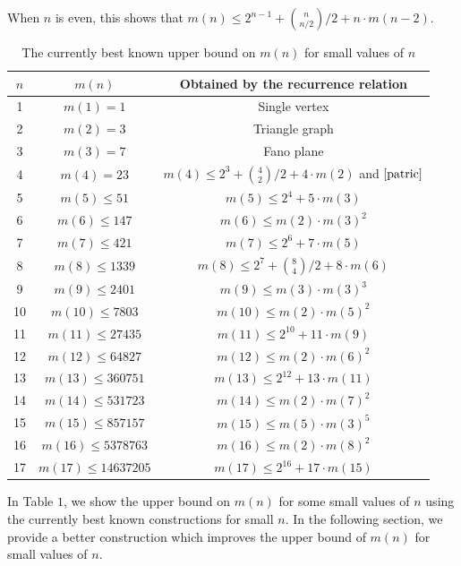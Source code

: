 \documentclass[11pt]{article}
\begin{document}
\noindent When $n$ is even, this shows that $m(n) \leq 2^{n-1} + {n \choose {n / 2}}/{2} + n \cdot m(n-2)$.
\begin{table}
\caption{The currently best known upper bound on $m(n)$ for small values of $n$}
\begin{center}
\begin{tabular}{|c|c|c|}
\hline
$n$ & $m(n)$ & Obtained by the recurrence relation\\
\hline
1& $m(1) = 1$&Single vertex\\
2&$m(2) = 3$&Triangle graph\\
3&$m(3) = 7$&Fano plane \cite{klein}\\
4&$m(4) = 23$&$m(4) \leq 2^3 + {4 \choose 2} / {2} + 4 \cdot m(2)$ and $\cite{patric}$\\
5&$m(5) \leq 51$&$m(5) \leq 2^4 + 5 \cdot m(3)$\\
6&$m(6) \leq 147$&$m(6) \leq m(2) \cdot m(3)^2$\\
7&$m(7) \leq 421$&$m(7) \leq 2^6 + 7 \cdot m(5)$\\
8&$m(8) \leq 1339$&$m(8) \leq 2^7 + {8 \choose 4} / {2} + 8 \cdot m(6)$\\
9&$m(9) \leq 2401$&$m(9) \leq m(3) \cdot m(3)^3$\\
10&$m(10) \leq 7803$&$m(10) \leq m(2) \cdot m(5)^2$\\
11&$m(11) \leq 27435$&$m(11) \leq 2^{10} + 11 \cdot m(9)$\\
12&$m(12) \leq 64827$&$m(12) \leq m(2) \cdot m(6)^2$\\
13&$m(13) \leq 360751$&$m(13) \leq 2^{12} + 13 \cdot m(11)$\\
14&$m(14) \leq 531723$&$m(14) \leq m(2) \cdot m(7)^2$\\
15&$m(15) \leq 857157$&$m(15) \leq m(5) \cdot m(3)^5$\\
16&$m(16) \leq 5378763$&$m(16) \leq m(2) \cdot m(8)^2$\\
17&$m(17) \leq 14637205$&$m(17) \leq 2^{16} + 17 \cdot m(15)$\\

\hline
\end{tabular}
\end{center}
\end{table}


In Table $1$, we show the upper bound on $m(n)$ for some small values of $n$ using the currently best known constructions for small $n$. In the following section, we provide a better construction which improves the upper bound of $m(n)$ for small values of $n$.
\end{document}

